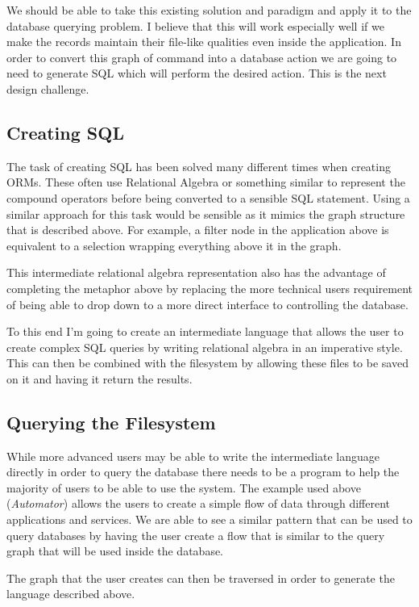 We should be able to take this existing solution and paradigm and apply it to
the database querying problem. I believe that this will work especially well if
we make the records maintain their file-like qualities even inside the
application. In order to convert this graph of command into a database action
we are going to need to generate \ac{SQL} which will perform the desired
action. This is the next design challenge.

\subsection{Creating SQL}

The task of creating \ac{SQL} has been solved many different times when
creating \acp{ORM}. These often use Relational Algebra or something similar to
represent the compound operators before being converted to a sensible SQL
statement. Using a similar approach for this task would be sensible as it
mimics the graph structure that is described above. For example, a filter node
in the application above is equivalent to a selection wrapping everything above
it in the graph.

This intermediate relational algebra representation also has the advantage of
completing the metaphor above by replacing the more technical users requirement
of being able to drop down to a more direct interface to controlling the
database.

To this end I'm going to create an intermediate language that allows the user
to create complex \ac{SQL} queries by writing relational algebra in an
imperative style. This can then be combined with the filesystem by allowing
these files to be saved on it and having it return the results.

\subsection{Querying the Filesystem}

While more advanced users may be able to write the intermediate language
directly in order to query the database there needs to be a program to help
the majority of users to be able to use the system. The example used above
(\emph{Automator}) allows the users to create a simple flow of data through
different applications and services. We are able to see a similar pattern that
can be used to query databases by having the user create a flow that is
similar to the query graph that will be used inside the database.

The graph that the user creates can then be traversed in order to generate
the language described above.
